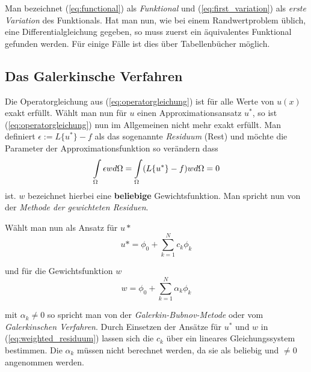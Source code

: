  Man bezeichnet (\ref{eq:functional}) als \textit{Funktional} und (\ref{eq:first_variation}) als \textit{erste Variation} des Funktionals.\newline
 Hat man nun, wie bei einem Randwertproblem üblich, eine Differentialgleichung gegeben, so muss zuerst ein äquivalentes Funktional gefunden werden. Für einige Fälle ist dies über Tabellenbücher möglich.


\subsection{Das Galerkinsche Verfahren}
Die Operatorgleichung aus (\ref{eq:operatorgleichung}) ist für alle Werte von $u(x)$ exakt erfüllt. Wählt man nun für $u$ einen Approximationsansatz $u^*$, so ist (\ref{eq:operatorgleichung}) nun im Allgemeinen nicht mehr exakt erfüllt. Man definiert $\epsilon := L\{ u^* \} -f$ als das sogenannte \textit{Residuum} (Rest) und möchte die Parameter der Approximationsfunktion so verändern dass 
\begin{equation}
\label{eq:weighted_residuum}
\int\displaylimits_{\Omega}\epsilon w d\Omega = \int\displaylimits_{\Omega} (L\{ u^* \} -f)w d\Omega= 0
\end{equation}
ist. $w$ bezeichnet hierbei eine \textbf{beliebige} Gewichtsfunktion. Man spricht nun von der \textit{Methode der gewichteten Residuen}.\newline


Wählt man nun als Ansatz für $u*$
\begin{equation}
u* = \phi_0 + \sum_{k = 1}^{N} c_k \phi_k
\end{equation}

und für die Gewichtsfunktion $w$
\begin{equation}
	w = \phi_0 + \sum_{k = 1}^{N} \alpha_k\phi_k
\end{equation}

mit $\alpha_k \neq 0$ so spricht man von der \textit{Galerkin-Bubnov-Metode} oder vom \textit{Galerkinschen Verfahren}. Durch Einsetzen der Ansätze für $u^*$ und $w$ in (\ref{eq:weighted_residuum}) lassen sich die $c_k$ über ein lineares Gleichungssystem bestimmen. Die $\alpha_k$ müssen nicht berechnet werden, da sie als beliebig und $\neq 0$ angenommen werden. 

